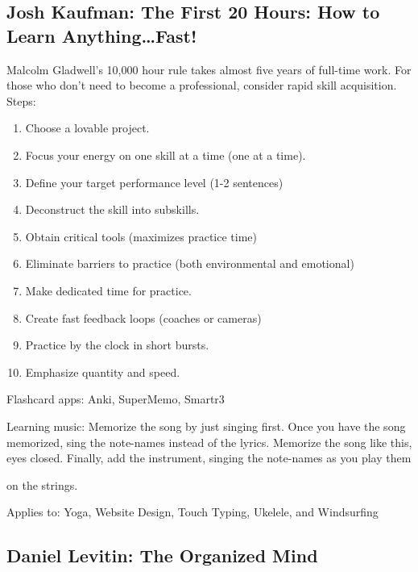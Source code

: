\documentclass[
]{article}
\begin{document}
\hypertarget{josh-kaufman-the-first-20-hours-how-to-learn-anythingfast}{%
\subsection{Josh Kaufman: The First 20 Hours: How to Learn
Anything\ldots Fast!}\label{josh-kaufman-the-first-20-hours-how-to-learn-anythingfast}}

Malcolm Gladwell's 10,000 hour rule takes almost five years of full-time
work. For those who don't need to become a professional, consider rapid
skill acquisition. Steps:

\begin{enumerate}
\def\labelenumi{\arabic{enumi}.}
\item
  Choose a lovable project.
\item
  Focus your energy on one skill at a time (one at a time).
\item
  Define your target performance level (1-2 sentences)
\item
  Deconstruct the skill into subskills.
\item
  Obtain critical tools (maximizes practice time)
\item
  Eliminate barriers to practice (both environmental and emotional)
\item
  Make dedicated time for practice.
\item
  Create fast feedback loops (coaches or cameras)
\item
  Practice by the clock in short bursts.
\item
  Emphasize quantity and speed.
\end{enumerate}

Flashcard apps: Anki, SuperMemo, Smartr3

Learning music: Memorize the song by just singing first. Once you have
the song memorized, sing the note-names instead of the lyrics. Memorize
the song like this, eyes closed. Finally, add the instrument, singing
the note-names as you play them

on the strings.

Applies to: Yoga, Website Design, Touch Typing, Ukelele, and Windsurfing

\hypertarget{daniel-levitin-the-organized-mind}{%
\subsection{Daniel Levitin: The Organized
Mind}\label{daniel-levitin-the-organized-mind}}
\end{document}
